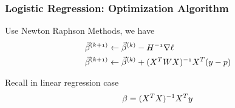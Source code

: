 \documentclass[notheorems, aspectratio=54]{beamer}
\begin{document}
\begin{frame}
\frametitle{Logistic Regression: Optimization Algorithm}
Use Newton Raphson Methods, we have
\begin{align*}
\mathnormal{\vec{\beta}^{(k+1)}} &\leftarrow \mathnormal{\vec{\beta}^{(k)}-{H}^{-1}\nabla\ell}\\
\mathnormal{\vec{\beta}^{(k+1)}} &\leftarrow \mathnormal{\vec{\beta}^{(k)}+({X}^T{W}{X})^{-1}{X}^T({y}-{p})}
\end{align*}

Recall in linear regression case
$$
\beta=(\mathnormal{X^T}\mathnormal{X})^{-1}\mathnormal{X^{T}}\mathnormal{y}
$$
\end{frame}
%
%
%
%
%
%
%
\end{document}
